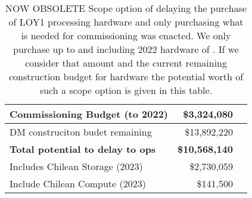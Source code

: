 \tiny \begin{longtable} { |p{}  |r  |r |} 
\caption{NOW OBSOLETE Scope option of delaying the purchase of LOY1 processing hardware and only purchasing what is needed for commissioning was enacted. We only purchase up to and including 2022 hardware of . If we consider that amount and the current remaining construction budget for hardware the potential worth of such a scope option is given in this table. \label{tab:Scope}}\\ 
\hline 
\textbf{Commissioning Budget (to 2022)  }&\textbf{\$3,324,080} \\ \hline
{DM construciton budet remaining}&{\$13,892,220} \\ \hline
\textbf{Total potential to delay to ops }&\textbf{\$10,568,140} \\ \hline
{Includes Chilean Storage (2023)}&{\$2,730,059} \\ \hline
{Include Chilean Compute (2023)}&{\$141,500} \\ \hline
\end{longtable} \normalsize
